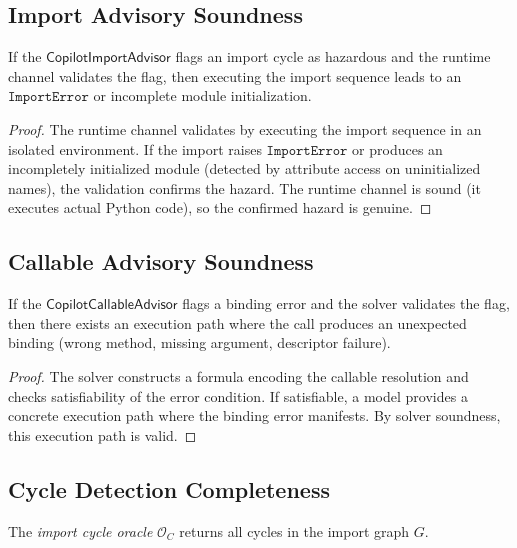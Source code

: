 \documentclass[11pt]{article}
\newcommand{\ImportAdv}{\mathsf{CopilotImportAdvisor}}
\newcommand{\CallAdv}{\mathsf{CopilotCallableAdvisor}}
\begin{document}
\subsection{Import Advisory Soundness}
\label{sec:formal:import}

\begin{theorem}
\label{thm:import-sound}
If the $\ImportAdv$ flags an import cycle as hazardous and the
runtime channel validates the flag, then executing the import
sequence leads to an $\texttt{ImportError}$ or incomplete
module initialization.
\end{theorem}

\begin{proof}
The runtime channel validates by executing the import sequence
in an isolated environment.  If the import raises
$\texttt{ImportError}$ or produces an incompletely initialized
module (detected by attribute access on uninitialized names),
the validation confirms the hazard.  The runtime channel is
sound (it executes actual Python code), so the confirmed hazard
is genuine.
\end{proof}

\subsection{Callable Advisory Soundness}
\label{sec:formal:callable}

\begin{theorem}
\label{thm:callable-sound}
If the $\CallAdv$ flags a binding error and the solver validates
the flag, then there exists an execution path where the call
produces an unexpected binding (wrong method, missing argument,
descriptor failure).
\end{theorem}

\begin{proof}
The solver constructs a formula encoding the callable resolution
and checks satisfiability of the error condition.  If satisfiable,
a model provides a concrete execution path where the binding error
manifests.  By solver soundness, this execution path is valid.
\end{proof}

\subsection{Cycle Detection Completeness}
\label{sec:formal:cycle}

\begin{definition}
\label{def:cycle-oracle}
The \emph{import cycle oracle} $\mathcal{O}_C$ returns all cycles
in the import graph $G$.
\end{definition}
\end{document}
